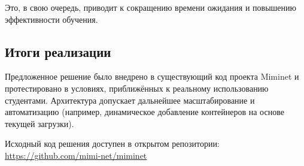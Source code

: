 Это, в свою очередь, приводит к сокращению времени ожидания и повышению эффективности обучения.

\subsection{Итоги реализации}
\label{subsec:summary}

Предложенное решение было внедрено в существующий код проекта Miminet и протестировано в условиях, приближённых к реальному использованию студентами. Архитектура допускает дальнейшее масштабирование и автоматизацию (например, динамическое добавление контейнеров на основе текущей загрузки).

Исходный код решения доступен в открытом репозитории: \url{https://github.com/mimi-net/miminet}
